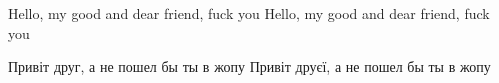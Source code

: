 \documentclass{article}
\begin{document}
\hfill \break
{\TimesNewRoman Hello, my good and dear friend, fuck you}
\hfill \break
{\TimesNewerRoman Hello, my good and dear friend, fuck you}

\hfill \break
{\TimesNewRoman Привіт друг, а не пошел бы ты в жопу}
\hfill \break
{\TimesNewerRoman Привіт друєї, а не пошел бы ты в жопу}
\end{document}
